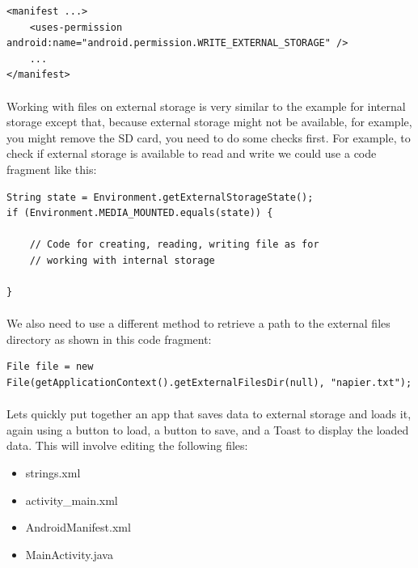 \begin{lstlisting}
<manifest ...>
    <uses-permission android:name="android.permission.WRITE_EXTERNAL_STORAGE" />
    ...
</manifest>
\end{lstlisting}

\paragraph{} Working with files on external storage is very similar to the example for internal storage except that, because external storage might not be available, for example, you might remove the SD card, you need to do some checks first. For example, to check if external storage is available to read and write we could use a code fragment like this:

\begin{lstlisting}
String state = Environment.getExternalStorageState();
if (Environment.MEDIA_MOUNTED.equals(state)) {
    
    // Code for creating, reading, writing file as for
    // working with internal storage

}
\end{lstlisting}

\paragraph{} We also need to use a different method to retrieve a path to the external files directory as shown in this code fragment:

\begin{lstlisting}
File file = new File(getApplicationContext().getExternalFilesDir(null), "napier.txt");
\end{lstlisting}

\paragraph{} Lets quickly put together an app that saves data to external storage and loads it, again using a button to load, a button to save, and a Toast to display the loaded data. This will involve editing the following files:

\begin{itemize}
\item strings.xml
\item activity\_main.xml
\item AndroidManifest.xml
\item MainActivity.java
\end{itemize}

